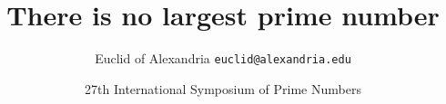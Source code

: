 \documentclass{beamer}
\title{There is no largest prime number}
\date[ISPN '80]{27th International Symposium of Prime Numbers}
\author[Euclid]{Euclid of Alexandria \texttt{euclid@alexandria.edu}}
\begin{document}
\begin{frame}
  \titlepage
\end{frame}
\end{document}
